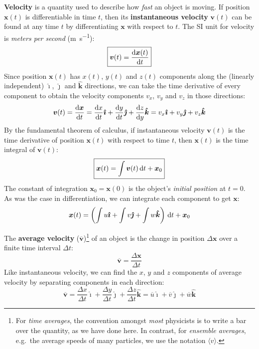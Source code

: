 \documentclass{../../oss-handout}
\begin{document}
\textbf{Velocity} is a quantity used to describe how \emph{fast} an object is
moving. If position $\bm x(t)$ is differentiable in time $t$, then its
\textbf{instantaneous velocity} $\bm v(t)$ can be found at any time $t$ by
differentiating $\bm x$ with respect to $t$. The SI unit for velocity is
\emph{meters per second} (\si{\metre\per\second}):
\begin{equation}
  \boxed{\bm v(t)= \diff{\bm x(t)}t}
\end{equation}
Since position $\bm x(t)$ has $x(t)$, $y(t)$ and $z(t)$ components along the
(linearly independent) $\bm{\hat\imath}$, $\bm{\hat\jmath}$ and $\bm{\hat k}$
directions, we can take the time derivative of every component to obtain the
velocity components $v_x$, $v_y$ and $v_z$ in those directions:
\begin{equation*}
  \bm v(t)= \diff{\bm x}t=
  \diff xt\bm{\hat\imath} + \diff yt\bm{\hat\jmath} + \diff zy\bm{\hat k}=
  v_x\bm{\hat\imath} + v_y\bm{\hat\jmath} + v_z\bm{\hat k}
\end{equation*}
By the fundamental theorem of calculus, if instantaneous velocity $\bm v(t)$
is the time derivative of position $\bm x(t)$ with respect to time $t$, then
$\bm x(t)$ is the time integral of $\bm v(t)$:
\begin{equation}
  \boxed{\bm x(t)=\int\bm v(t)\dl t + \bm x_0}
\end{equation}
The constant of integration $\bm x_0=\bm x(0)$ is the object's \emph{initial
  position} at $t=0$. As was the case in differentiation, we can integrate each
component to get $\bm x$:
\begin{equation*}
  \bm x(t)= \left(
  \int u\bm{\hat{\imath}} + \int v\bm{\hat{\jmath}} + \int w\bm{\hat{k}}
  \right)\dl t + \bm x_0
\end{equation*}


The \textbf{average velocity} ($\overline{\bm v}$)\footnote{For
\emph{time averages}, the convention amongst \emph{most} physicists is to
write a bar over the quantity, as we have done here. In contrast, for
\emph{ensemble averages}, e.g.\ the average speeds of many particles, we use
the notation $\langle v\rangle$.} of an object is the change in position
$\Delta\bm x$ over a finite time interval $\Delta t$:
\begin{equation}
  \boxed{\overline{\bm v}= \frac{\Delta\bm x}{\Delta t}}
\end{equation}
Like instantaneous velocity, we can find the $x$, $y$ and $z$ components of
average velocity by separating components in each direction:
\begin{equation*}
  \overline{\bm v}=
  \frac{\Delta x}{\Delta t}\bm{\hat\imath} +
  \frac{\Delta y}{\Delta t}\bm{\hat\jmath} +
  \frac{\Delta z}{\Delta t}\bm{\hat k} =
  \overline u\bm{\hat\imath} +
  \overline v\bm{\hat\jmath} +
  \overline w\bm{\hat k}
\end{equation*}
\end{document}
